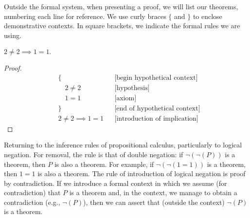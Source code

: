 Outside the formal system, when presenting a proof, we will list our theorems,
numbering each line for reference. We use curly braces $\{$ and $\}$ to enclose
demonstrative contexts. In square brackets, we indicate the formal rules we are
using.
\begin{theorem}
  $2 \neq 2 \implies 1=1$.
\end{theorem}
%  
\begin{proof}
  \begin{align}
    &\{ & &\text{[begin hypothetical context]} \\ 
    &\quad 2\neq 2 & & \text{[hypothesis]}  \\
    &\quad 1=1 & & \text{[axiom]} \\
    &\} & & \text{[end of hypothetical context]} \\
    &2\neq 2 \implies 1=1 & & \text{[introduction of implication]}
  \end{align}
\end{proof}


Returning to the inference rules of propositional calculus, particularly to
logical negation.
%
%
For removal, the rule is that of double negation: if $\lnot (\lnot (P))$ is a
theorem, then $P$ is also a theorem. For example, if $\lnot (\lnot (1=1))$ is a
theorem, then $1=1$ is also a theorem.
%
The rule of introduction of logical negation is proof by contradiction.
%
%
If we introduce a formal context in which we assume (for contradiction) that $P$
is a theorem and, in the context, we manage to obtain a contradiction (e.g.,
$\lnot (P)$), then we can assert that (outside the context) $\lnot (P)$ is a
theorem.

